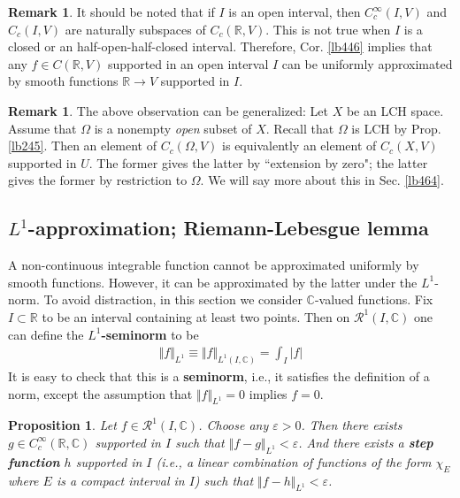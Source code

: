 \documentclass[12pt,b5paper,notitlepage]{article}
\theoremstyle{definition}
\newtheorem{rem}[df]{Remark}
\theoremstyle{plain}
\newtheorem{pp}[df]{Proposition}
\newcommand{\scr}{\mathscr}
\newcommand{\Cbb}{\mathbb C}
\newcommand{\Rbb}{\mathbb R}
\newcommand{\eps}{\varepsilon}
\numberwithin{equation}{section}
\begin{document}
\begin{rem}
It should be noted that if $I$ is an open interval, then $C_c^\infty(I,V)$ and $C_c(I,V)$ are naturally subspaces of $C_c(\Rbb,V)$. This is not true when $I$ is a closed or an half-open-half-closed interval. Therefore, Cor. \ref{lb446} implies that any $f\in C(\Rbb,V)$ supported in an open interval $I$ can be uniformly approximated by smooth functions $\Rbb\rightarrow V$ supported in $I$.
\end{rem}


\begin{rem}
The above observation can be generalized: Let $X$ be an LCH space. Assume that $\Omega$ is a nonempty \textit{open} subset of $X$. Recall that $\Omega$ is LCH by Prop. \ref{lb245}. Then an element of $C_c(\Omega,V)$ is equivalently an element of $C_c(X,V)$ supported in $U$. The former gives the latter by ``extension by zero"; the latter gives the former by restriction to $\Omega$. We will say more about this in Sec. \ref{lb464}.
\end{rem}





\subsection{$L^1$-approximation; Riemann-Lebesgue lemma}


A non-continuous integrable function cannot be approximated uniformly by smooth functions. However, it can be approximated by the latter under the $L^1$-norm. To avoid distraction, in this section we consider $\Cbb$-valued functions. Fix $I\subset\Rbb$ to be an interval containing at least two points. Then on $\scr R^1(I,\Cbb)$ one can define the \textbf{$L^1$-seminorm}  to be
\begin{align}
\Vert f\Vert_{L^1}\equiv\Vert f\Vert_{L^1(I,\Cbb)}=\int_I |f|
\end{align}
It is easy to check that this is a \textbf{seminorm}, i.e., it satisfies the definition of a norm, except the assumption that $\Vert f\Vert_{L^1}=0$ implies $f=0$.

\begin{pp}\label{lb445}
Let $f\in\scr R^1(I,\Cbb)$. Choose any $\eps>0$. Then there exists $g\in C_c^\infty(\Rbb,\Cbb)$ supported in $I$ such that $\Vert f-g\Vert_{L^1}<\eps$. And there exists a \textbf{step function} $h$ supported in $I$ (i.e., a linear combination of functions of the form $\chi_E$ where $E$ is a compact interval in $I$) such that $\Vert f-h\Vert_{L^1}<\eps$.
\end{pp}
\end{document}
